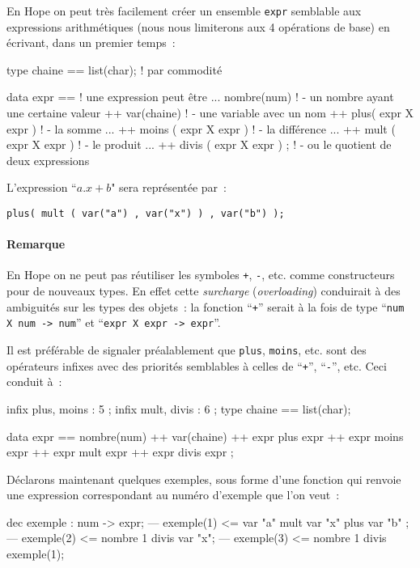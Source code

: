 En Hope on peut très facilement créer un ensemble \texttt{expr} semblable aux
expressions arithmétiques (nous nous limiterons aux 4 opérations de
base) en écrivant, dans un premier temps~:
\begin{verbatimtab}
type chaine == list(char);	! par commodité

data expr == 			! une expression peut être ...
   	nombre(num)		! 	- un nombre ayant une certaine valeur
++	var(chaine)		! 	- une variable avec un nom
++	plus( expr X expr )	! 	- la somme ...
++ 	moins ( expr X expr )	!	- la différence ...
++ 	mult ( expr X expr )	! 	- le produit ...
++ 	divis ( expr X expr ) ;	!	- ou le quotient de deux expressions
\end{verbatimtab}

L'expression ``$a.x + b$" sera représentée par~:  

\begin{verbatim}
plus( mult ( var("a") , var("x") ) , var("b") );
\end{verbatim}

\paragraph*{Remarque}

En Hope on ne peut pas réutiliser les symboles \verb/+/, \verb/-/,
etc. comme constructeurs pour de nouveaux types. En effet cette
\emph{surcharge} (\emph{overloading}) conduirait à des ambiguités sur les types
des objets~: la fonction ``\verb/+/'' serait à la fois de type 
``\verb/num X num -> num/'' et ``\verb+expr X expr -> expr+''.


Il est préférable de signaler préalablement que \verb+plus+,
\verb+moins+, etc. sont des opérateurs infixes avec des priorités
semblables à celles de ``\verb/+/'', ``\verb/-/'', etc. Ceci conduit à~:
\begin{verbatimtab}
infix plus, moins : 5 ;
infix mult, divis : 6 ;
type chaine == list(char);

data expr == nombre(num)
	  ++ var(chaine)
 	  ++ expr plus expr
	  ++ expr moins expr
 	  ++ expr mult expr
  	  ++ expr divis expr ;
\end{verbatimtab}
Déclarons maintenant quelques exemples, sous forme d'une fonction qui
renvoie une expression correspondant au numéro d'exemple que l'on
veut~:
\begin{verbatimtab}
dec exemple : num -> expr;
--- exemple(1) <= var "a" mult var "x"  plus var "b" ;
--- exemple(2) <= nombre 1 divis var "x";
--- exemple(3) <= nombre 1 divis exemple(1);
\end{verbatimtab}

